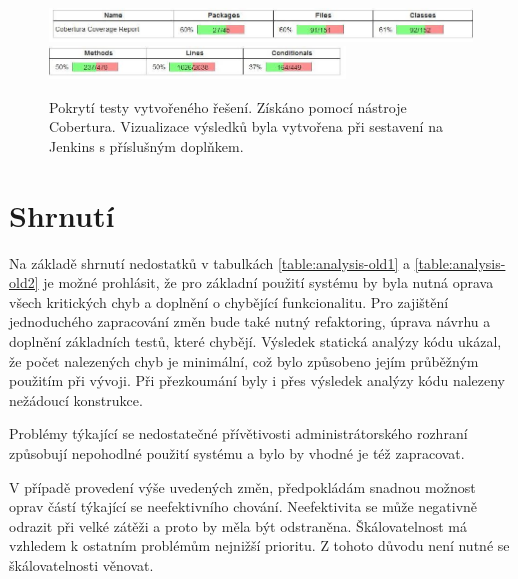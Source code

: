 \documentclass[thesis=B,czech]{FITthesis}[2012/06/26]
\begin{document}
\begin{figure}[h]\centering
 	\includegraphics[width=1.0\textwidth]{resources/cobertura-report-old-1}
 	\includegraphics[width=0.7\textwidth]{resources/cobertura-report-old-2}
	\caption[Pokrytí testy vytvořeného řešení]{Pokrytí testy vytvořeného řešení. Získáno pomocí nástroje Cobertura. Vizualizace
	výsledků byla vytvořena při sestavení na Jenkins s příslušným doplňkem.}\label{fig:cober-old}
\end{figure}

\section{Shrnutí}\label{ch:project-analysis}

Na základě shrnutí nedostatků v tabulkách \ref{table:analysis-old1} a \ref{table:analysis-old2} je možné prohlásit, že pro základní použití systému by byla nutná oprava všech kritických chyb a doplnění o chybějící funkcionalitu. Pro zajištění jednoduchého zapracování změn bude také nutný refaktoring, úprava návrhu a doplnění základních testů, které chybějí.
Výsledek statická analýzy kódu ukázal, že počet nalezených chyb je minimální, což bylo způsobeno jejím průběžným použitím při vývoji. Při přezkoumání byly i přes výsledek analýzy kódu nalezeny nežádoucí konstrukce.
\par
Problémy týkající se nedostatečné přívětivosti administrátorského rozhraní způsobují nepohodlné použití systému a bylo by vhodné je též zapracovat.
\par
V případě provedení výše uvedených změn, předpokládám
snadnou možnost oprav částí týkající se neefektivního chování.
Neefektivita se může negativně odrazit při velké zátěži a proto by měla být odstraněna.
Škálovatelnost má vzhledem k ostatním problémům nejnižší prioritu. Z tohoto důvodu není nutné se škálovatelnosti věnovat.
\end{document}
